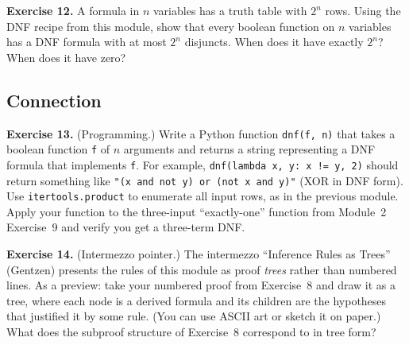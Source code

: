 \documentclass[11pt]{article}
\begin{document}
\bigskip
\textbf{Exercise 12.}\label{ex:m3:12} A formula in $n$ variables has a truth table with $2^n$ rows. Using the DNF recipe from this module, show that every boolean function on $n$ variables has a DNF formula with at most $2^n$ disjuncts. When does it have exactly $2^n$? When does it have zero?

\subsection*{Connection}

\textbf{Exercise 13.}\label{ex:m3:13} (Programming.) Write a Python function \texttt{dnf(f, n)} that takes a boolean function \texttt{f} of $n$ arguments and returns a string representing a DNF formula that implements \texttt{f}. For example, \texttt{dnf(lambda x, y: x != y, 2)} should return something like \texttt{"(x and not y) or (not x and y)"} (XOR in DNF form). Use \texttt{itertools.product} to enumerate all input rows, as in the previous module. Apply your function to the three-input ``exactly-one'' function from Module~2 Exercise~9 and verify you get a three-term DNF.

\bigskip
\textbf{Exercise 14.}\label{ex:m3:14} (Intermezzo pointer.) The intermezzo ``Inference Rules as Trees'' (Gentzen) presents the rules of this module as proof \emph{trees} rather than numbered lines. As a preview: take your numbered proof from Exercise~8 and draw it as a tree, where each node is a derived formula and its children are the hypotheses that justified it by some rule. (You can use ASCII art or sketch it on paper.) What does the subproof structure of Exercise~8 correspond to in tree form?
\end{document}
